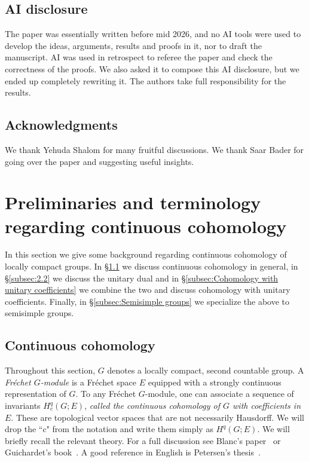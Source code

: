 \documentclass[12pt,reqno]{amsart}
\theoremstyle{definition}
\begin{document}
\subsection{AI disclosure}
The paper was essentially written before mid 2026, and no AI tools were used to develop the ideas, arguments, results and proofs in it, nor to draft the manuscript. AI was used in retrospect to referee the paper and check the correctness of the proofs. We also asked it to compose this AI disclosure, but we ended up completely rewriting it. The authors take full responsibility for the results.

 \subsection{Acknowledgments}
We thank Yehuda Shalom for many fruitful discussions. We thank Saar Bader for going over the paper and suggesting useful insights.

\section{Preliminaries and terminology regarding continuous cohomology}\label{sec:2}

In this section we give some background regarding continuous cohomology of locally compact groups.
In \S\ref{prelim: continuous cohomology} we discuss continuous cohomology in general, in \S\ref{subsec:2.2} we discuss the unitary dual and in \S\ref{subsec:Cohomology with unitary coefficients} we combine the two and discuss cohomology with unitary coefficients.
Finally, in \S\ref{subsec:Semisimple groups} we specialize the above to semisimple groups.


\subsection{Continuous cohomology} \label{prelim: continuous cohomology}
Throughout this section, $G$ denotes a locally compact, second countable group. A \emph{Fr\'echet $G$-module} is a Fr\'echet space $E$ equipped with a strongly continuous representation of $G$. To any Fr\'echet $G$-module, one can associate a sequence of invariants $H^q_c(G;E)$, \emph{called the continuous cohomology of $G$ with coefficients in $E$}. These are topological vector spaces that are not necessarily Hausdorff. We will drop the ``c" from the notation and write them simply as $H^q(G;E)$. We will briefly recall the relevant theory. For a full discussion see Blanc's paper~\cite{Blanc} or Guichardet's book~\cite{Guichardet}. A good reference in English is Petersen's thesis~\cite{Petersen}.
\end{document}
